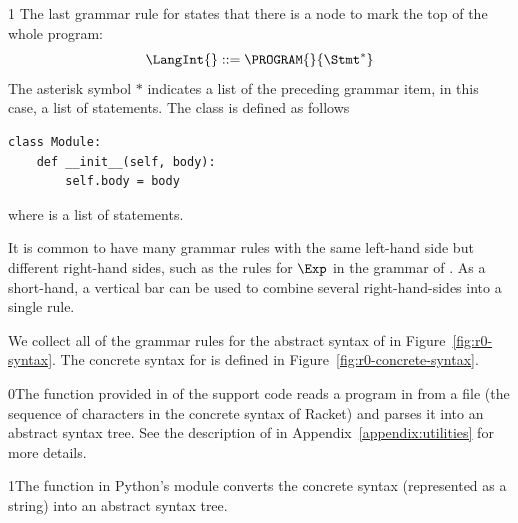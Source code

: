 \documentclass[7x10]{TimesAPriori_MIT}%
\def\racketEd{0}
\def\pythonEd{1}
\def\edition{1}
\newcommand{\racket}[1]{{\if\edition\racketEd{#1}\fi}}
\newcommand{\python}[1]{{\if\edition\pythonEd #1\fi}}
\begin{document}
{\if\edition\pythonEd
The last grammar rule for \LangInt{} states that there is a
 node to mark the top of the whole program:
\[
  \LangInt{} ::= \PROGRAM{}{\Stmt^{*}}
\]
The asterisk symbol $*$ indicates a list of the preceding grammar item, in
this case, a list of statements.
%
The  class is defined as follows
\begin{lstlisting}
class Module:
    def __init__(self, body):
        self.body = body
\end{lstlisting}
where  is a list of statements.
\fi}

It is common to have many grammar rules with the same left-hand side
but different right-hand sides, such as the rules for $\Exp$ in the
grammar of \LangInt{}. As a short-hand, a vertical bar can be used to
combine several right-hand-sides into a single rule.

We collect all of the grammar rules for the abstract syntax of \LangInt{}
in Figure~\ref{fig:r0-syntax}. The concrete syntax for \LangInt{} is
defined in Figure~\ref{fig:r0-concrete-syntax}.

\racket{The  function provided in
  \code{utilities.rkt} of the support code reads a program in from a
  file (the sequence of characters in the concrete syntax of Racket)
  and parses it into an abstract syntax tree. See the description of
  \code{read-program} in Appendix~\ref{appendix:utilities} for more
  details.}

\python{The  function in Python's  module
  converts the concrete syntax (represented as a string) into an
  abstract syntax tree.}

\newcommand{\LintGrammarRacket}{
  \begin{array}{rcl}
    \Type &::=& \key{Integer} \\
    \Exp{} &::=& \Int{} \MID \CREAD \RP \MID \CNEG{\Exp} \MID \CADD{\Exp}{\Exp}
  \end{array}
}
\newcommand{\LintASTRacket}{
  \begin{array}{rcl}
    \Type &::=& \key{Integer} \\
    \Exp{} &::=& \INT{\Int} \MID \READ{} \\
           &\MID& \NEG{\Exp} \MID \ADD{\Exp}{\Exp}
  \end{array}
}
\newcommand{\LintGrammarPython}{
\begin{array}{rcl}
  \Exp &::=& \Int \MID \key{input\_int}\LP\RP \MID \key{-}\;\Exp \MID \Exp \; \key{+} \; \Exp \MID \Exp \; \key{-} \; \Exp \MID \LP\Exp\RP \\
  \Stmt &::=& \key{print}\LP \Exp \RP \MID \Exp
\end{array}
}
\newcommand{\LintASTPython}{
  \begin{array}{rcl}
  \itm{binaryop} &::= & \code{Add()} \MID \code{Sub()} \\
  \itm{unaryop} &::= & \code{USub()} \\
  \Exp{} &::=& \INT{\Int} \MID \READ{} \\
        &\MID& \UNIOP{\itm{unaryop}}{\Exp} \MID  \BINOP{\itm{binaryop}}{\Exp}{\Exp}  \\
  \Stmt{} &::=& \PRINT{\Exp} \MID \EXPR{\Exp} 
\end{array}
}
\end{document}
